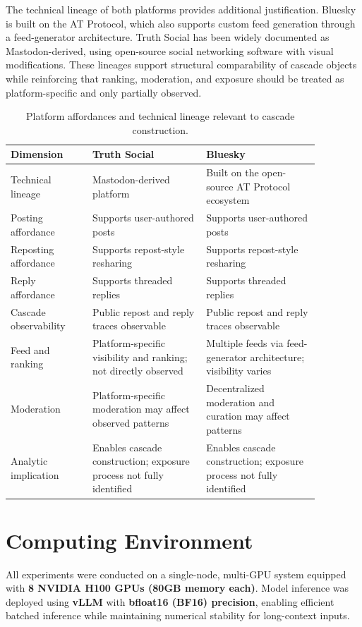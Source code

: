 \documentclass[letterpaper]{article} %
\begin{document}
The technical lineage of both platforms provides additional justification. Bluesky is built on the AT Protocol, which also supports custom feed generation through a feed-generator architecture. Truth Social has been widely documented as Mastodon-derived, using open-source social networking software with visual modifications. These lineages support structural comparability of cascade objects while reinforcing that ranking, moderation, and exposure should be treated as platform-specific and only partially observed.

\begin{table}[ht]
\centering
\small
\caption{Platform affordances and technical lineage relevant to cascade construction.}
\label{tab:platform_affordances}
\begin{tabular}{p{0.23\linewidth}p{0.32\linewidth}p{0.32\linewidth}}
\toprule
\textbf{Dimension} & \textbf{Truth Social} & \textbf{Bluesky} \\
\midrule
Technical lineage
& Mastodon-derived platform
& Built on the open-source AT Protocol ecosystem \\

Posting affordance
& Supports user-authored posts
& Supports user-authored posts \\

Reposting affordance
& Supports repost-style resharing
& Supports repost-style resharing \\

Reply affordance
& Supports threaded replies
& Supports threaded replies \\

Cascade observability
& Public repost and reply traces observable
& Public repost and reply traces observable \\

Feed and ranking
& Platform-specific visibility and ranking; not directly observed
& Multiple feeds via feed-generator architecture; visibility varies \\

Moderation
& Platform-specific moderation may affect observed patterns
& Decentralized moderation and curation may affect patterns \\

Analytic implication
& Enables cascade construction; exposure process not fully identified
& Enables cascade construction; exposure process not fully identified \\
\bottomrule
\end{tabular}
\end{table}

\section{Computing Environment}

All experiments were conducted on a single-node, multi-GPU system equipped with \textbf{8 NVIDIA H100 GPUs (80GB memory each)}. Model inference was deployed using \textbf{vLLM} with \textbf{bfloat16 (BF16) precision}, enabling efficient batched inference while maintaining numerical stability for long-context inputs.
\end{document}
